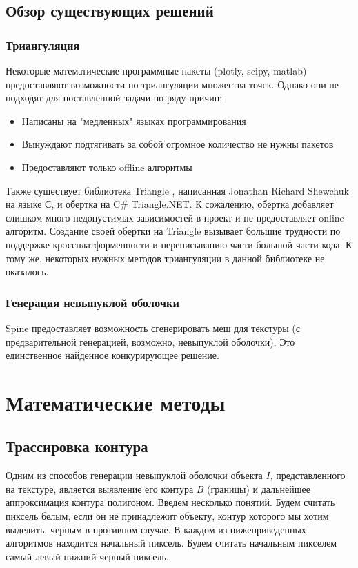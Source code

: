 \documentclass{fefu}
\begin{document}
\subsection{Обзор существующих решений}
\subsubsection{Триангуляция}
Некоторые математические программные пакеты (plotly, scipy, matlab) предоставляют возможности по триангуляции
множества точек. Однако они не подходят для поставленной задачи по ряду причин:
\begin{itemize}
    \item Написаны на "медленных" языках программирования
    \item Вынуждают подтягивать за собой огромное количество не нужны пакетов
    \item Предоставляют только offline алгоритмы
\end{itemize}
Также существует библиотека Triangle \cite{TriangleSite}, написанная Jonathan Richard Shewchuk на языке С, и
обертка на C\# Triangle.NET. К сожалению, обертка добавляет слишком много недопустимых зависимостей в проект и не
предоставляет online алгоритм. Создание своей обертки на Triangle вызывает большие трудности по поддержке
кроссплатформенности и переписыванию части большой части кода. К тому же, некоторых нужных методов триангуляции в
данной библиотеке не оказалось.
\subsubsection{Генерация невыпуклой оболочки}
Spine предоставляет возможность сгенерировать меш для текстуры (с предварительной генерацией, возможно, невыпуклой оболочки).
Это единственное найденное конкурирующее решение.
\section{Математические методы}
\subsection{Трассировка контура}
Одним из способов генерации невыпуклой оболочки объекта $I$, представленного на текстуре, является выявление
его контура $B$ (границы) и дальнейшее аппроксимация контура полигоном. Введем несколько понятий. Будем считать
пиксель белым, если он не принадлежит объекту, контур которого мы хотим выделить, черным в противном случае.
В каждом из нижеприведенных алгоритмов находится начальный пиксель. Будем считать начальным пикселем самый левый
нижний черный пиксель.
\end{document}

